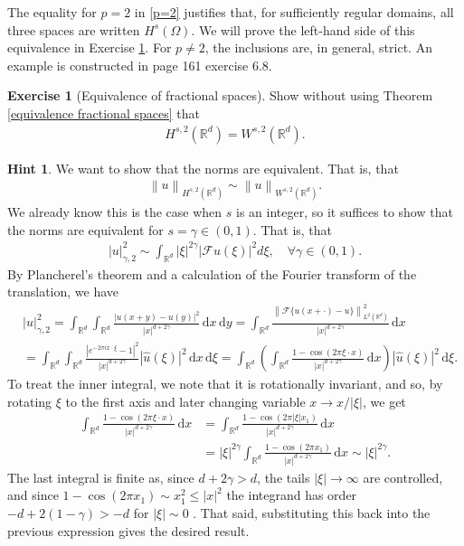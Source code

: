 \documentclass[
    a4paper,
    DIV=14,
    abstract=true,
    numbers=noenddot
]
{scrartcl}
\theoremstyle{definition}
\newtheorem{exercise}{Exercise}
\newtheorem*{hint}{Hint}
\newcommand{\wh}[1]{\widehat{#1}}
\renewcommand{\norm}[1]{\left\lVert #1 \right\rVert}\renewcommand{\abs}[1]{\left| #1 \right|}
\renewcommand{\d}{\,\mathrm{d}}\newcommand{\dx}{\,\mathrm{d}x}
\newcommand{\R}{\mathbb{R}}
\newcommand{\Ff}{\mathcal{F}}
\begin{document}
The equality for $p=2$ in \eqref{p=2} justifies that, for sufficiently regular domains, all three spaces are written $H^s(\Omega )$.   We will prove the left-hand side of this equivalence in Exercise \ref{equivalence of fractional spaces}. For $p\neq 2$, the inclusions are, in general, strict. An example is constructed in \cite{stein1970singular} page 161 exercise 6.8.
\begin{exercise}[Equivalence of fractional spaces]\label{equivalence of fractional spaces}
    Show without using Theorem \ref{equivalence fractional spaces} that
    \begin{align*}
        H^{s,2}(\R^d)=W^{s,2}(\R^d).
    \end{align*}
\end{exercise}
\begin{hint}
    We want to show that the norms are equivalent. That is, that
    \begin{align*}
        \norm{u}_{H^{s,2}(\R^d)}\sim\norm{u}_{W^{s,2}(\R^d)}.
    \end{align*}
    We already know this is the case when $s$ is an integer, so it suffices to show that the norms are equivalent for $s= \gamma  \in (0,1)$. That is, that
    \begin{align*}
        |u|_{\gamma ,2}^2\sim \int_{\mathbb{R}^d}|\xi|^{2 \gamma }|\mathcal{F} u(\xi)|^2 d \xi , \quad\forall \gamma \in (0,1).
    \end{align*}
    By Plancherel's theorem and a calculation of the Fourier transform of the translation, we have
    \begin{align*}
         & |u|_{\gamma ,2}^2  =\int_{\R^d}\int_{\R^d}\frac{\abs{u(x+y)-u(y)}^2}{\abs{x}^{d+2\gamma	}}\d x \d y                                                                                                       = \int_{\R^d}\frac{\norm{\Ff \{u(x+\cdot )-u\}}^2_{L^2(\R^d)}}{\abs{x}^{d+2\gamma	}}\d x \\
         & =\int_{\R^d}\int_{\R^d}  \frac{|e^{-2 \pi i x \cdot \xi}-1|^2}{\abs{x}^{d+2\gamma	}}|\wh{u}(\xi)|^2\d x\d\xi =\int_{\R^d}\left(\int_{\R^d}  \frac{1-\cos(2\pi \xi\cdot x)}{\abs{x}^{d+2\gamma	}}\d x\right)|\wh{u}(\xi)|^2\d\xi.
    \end{align*}
    To treat the inner integral, we note that it is rotationally invariant, and so, by rotating $\xi$ to the first axis and later changing variable $x \to x / \abs{\xi}$, we get
    \begin{align*}
        \int_{\R^d}  \frac{1-\cos(2\pi \xi\cdot x)}{\abs{x}^{d+2\gamma	}}\d x & =\int_{\R^d}  \frac{1-\cos(2\pi \abs{\xi}x_1 )}{\abs{x}^{d+2\gamma	}}\d x                                          \\
                                                                              & =\abs{\xi}^{2 \gamma } \int_{\R^d}  \frac{1-\cos(2\pi  x_1) }{\abs{x}^{d+2\gamma	}}\d x\sim \abs{\xi}^{2 \gamma }.
    \end{align*}
    The last integral is finite as, since $d+2\gamma >d$, the tails $\abs{\xi}\to\infty$ are controlled, and since $1-\cos(2\pi x_1)\sim x_1^2\leq \abs{x}^2$ the integrand has order $-d+2(1-\gamma)>-d$ for $\abs{\xi}\sim 0$ . That said, substituting this back into the previous expression gives the desired result.
\end{hint}
\end{document}
